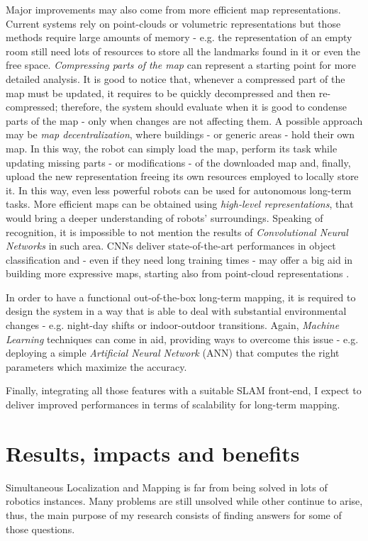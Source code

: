\documentclass[10pt,a4paper, notitlepage]{report}
\begin{document}
Major improvements may also come from more efficient map representations. Current systems rely on point-clouds or volumetric representations but those methods require large amounts of memory - e.g. the representation of an empty room still need lots of resources to store all the landmarks found in it or even the free space. \textit{Compressing parts of the map} \cite{lynen2015getoutofmylab} can represent a starting point for more detailed analysis. It is good to notice that, whenever a compressed part of the map must be updated, it requires to be quickly decompressed and then re-compressed; therefore, the system should evaluate when it is good to condense parts of the map - only when changes are not affecting them. A possible approach may be \textit{map decentralization}, where buildings - or generic areas - hold their own map. In this way, the robot can simply load the map, perform its task while updating missing parts - or modifications - of the downloaded map and, finally, upload the new representation freeing its own resources employed to locally store it. In this way, even less powerful robots can be used for autonomous long-term tasks. More efficient maps can be obtained using \textit{high-level representations}, that would bring a deeper understanding of robots' surroundings. Speaking of recognition, it is impossible to not mention the results of \textit{Convolutional Neural Networks} \cite{krizhevsky2012alexnet} in such area. CNNs deliver state-of-the-art performances in object classification and - even if they need long training times - may offer a big aid in building more expressive maps, starting also from point-cloud representations \cite{maturana2015voxnet}.

In order to have a functional out-of-the-box long-term mapping, it is required to design the system in a way that is able to deal with substantial environmental changes - e.g. night-day shifts or indoor-outdoor transitions. Again, \textit{Machine Learning} techniques can come in aid, providing ways to overcome this issue - e.g. deploying a simple \textit{Artificial Neural Network} (ANN) that computes the right parameters which maximize the accuracy.

Finally, integrating all those features with a suitable SLAM front-end, I expect to deliver improved performances in terms of scalability for long-term mapping.

\section*{Results, impacts and benefits}
Simultaneous Localization and Mapping is far from being solved in lots of robotics instances. Many problems are still unsolved while other continue to arise, thus, the main purpose of my research consists of finding answers for some of those questions. 
\end{document}
